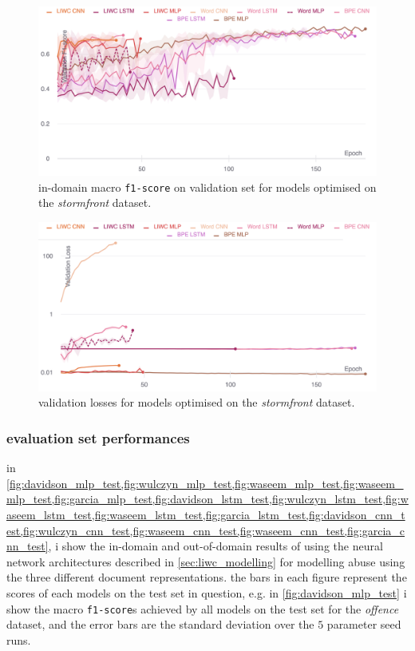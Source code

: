 \begin{figure}
    \centering
    \includegraphics[width=\textwidth]{garcia_dev_f1.pdf}
    \caption{in-domain macro \texttt{f1-score} on validation set for models optimised on the \textit{stormfront} dataset.}
    \label{fig:garcia_dev_f1}
\end{figure}
\begin{figure}
    \centering
    \includegraphics[width=\textwidth]{garcia_dev_loss_stderr_logscale.pdf}
    \caption{validation losses for models optimised on the \textit{stormfront} dataset.}
    \label{fig:garcia_dev_loss}
\end{figure}

\subsubsection{evaluation set performances}
in \cref{fig:davidson_mlp_test,fig:wulczyn_mlp_test,fig:waseem_mlp_test,fig:waseem_mlp_test,fig:garcia_mlp_test,fig:davidson_lstm_test,fig:wulczyn_lstm_test,fig:waseem_lstm_test,fig:waseem_lstm_test,fig:garcia_lstm_test,fig:davidson_cnn_test,fig:wulczyn_cnn_test,fig:waseem_cnn_test,fig:waseem_cnn_test,fig:garcia_cnn_test}, i show the in-domain and out-of-domain results of using the neural network architectures described in \cref{sec:liwc_modelling} for modelling abuse using the three different document representations.
the bars in each figure represent the scores of each models on the test set in question, e.g. in \cref{fig:davidson_mlp_test} i show the macro \texttt{f1-score}s achieved by all models on the test set for the \textit{offence} dataset, and the error bars are the standard deviation over the $5$ parameter seed runs.

